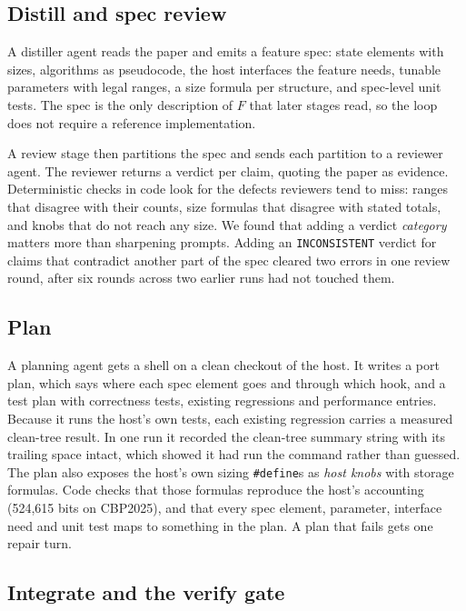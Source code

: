 \documentclass[conference]{IEEEtran}
\begin{document}
\subsection{Distill and spec review}

A distiller agent reads the paper and emits a feature spec: state elements with
sizes, algorithms as pseudocode, the host interfaces the feature needs, tunable
parameters with legal ranges, a size formula per structure, and spec-level unit
tests. The spec is the only description of $F$ that later stages read, so the
loop does not require a reference implementation.

A review stage then partitions the spec and sends each partition to a reviewer
agent. The reviewer returns a verdict per claim, quoting the paper as evidence.
Deterministic checks in code look for the defects reviewers tend to miss:
ranges that disagree with their counts, size formulas that disagree with stated
totals, and knobs that do not reach any size. We found that adding a verdict
\emph{category} matters more than sharpening prompts. Adding an
\texttt{INCONSISTENT} verdict for claims that contradict another part of the
spec cleared two errors in one review round, after six rounds across two
earlier runs had not touched them.

\subsection{Plan}

A planning agent gets a shell on a clean checkout of the host. It writes a port
plan, which says where each spec element goes and through which hook, and a
test plan with correctness tests, existing regressions and performance entries.
Because it runs the host's own tests, each existing regression carries a
measured clean-tree result. In one run it recorded the clean-tree summary
string with its trailing space intact, which showed it had run the command
rather than guessed. The plan also exposes the host's own sizing
\texttt{\#define}s as \emph{host knobs} with storage formulas. Code checks that
those formulas reproduce the host's accounting (524,615 bits on CBP2025), and
that every spec element, parameter, interface need and unit test maps to
something in the plan. A plan that fails gets one repair turn.

\subsection{Integrate and the verify gate}
\end{document}
